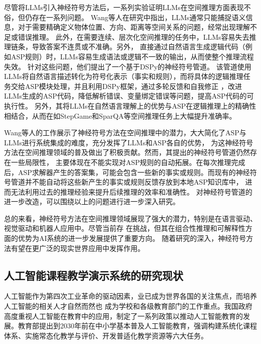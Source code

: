 尽管将LLMs引入神经符号方法后，一系列实验证明LLMs在空间推理方面表现不俗，但仍存在一系列问题。
Wang等人\cite{wang2024dspy}在研究中指出，LLMs通常只能捕捉语义信息，对于需要精确定义物体位置、方向、距离等空间关系的问题，经常出现理解不足或错误推理。
此外，在需要连续、层次化空间推理的任务中，LLMs容易失去推理链条，导致答案不连贯或不准确。另外，
直接通过自然语言生成逻辑代码（例如ASP规则）时，LLMs容易生成语法或逻辑不一致的输出，从而使整个推理流程失效。
针对这些问题，他们提出了一个基于DSPy的神经符号管道。
该管道使用LLMs将自然语言描述转化为符号化表示（事实和规则），而将具体的逻辑推理任务交给ASP模块处理，并且利用DSPy框架，通过多轮反馈和自我修正
，改进LLMs生成的ASP代码，降低解析错误、变量绑定错误等问题，提高ASP代码的可执行性。
另外，其将LLMs在自然语言理解上的优势与ASP在逻辑推理上的精确性相结合，从而在如StepGame和SparQA等空间推理任务上大幅提升准确率。

Wang等人\cite{wang2024dspy}的工作展示了神经符号方法在空间推理中的潜力，大大简化了ASP与LLMs进行系统集成的难度，充分发挥了LLMs和ASP各自的优势，
为这神经符号方法在空间推理领域的普及做出了积极贡献。然而，其提出的神经符号管道仍然存在一些局限性，
主要体现在不能实现对ASP规则的自动拓展。在每次推理完成后，ASP求解器产生的答案集，可能会包含一些新的事实或规则。而现有的神经符号管道并不能自动将这些新产生的事实或规则反馈存放到本地ASP知识库中，
进而无法利用过去的推理经验来提升后续推理的效率和准确性。
对神经符号管道的进一步改造，可以围绕以上的问题进行进一步深入研究。

总的来看，神经符号方法在空间推理领域展现了强大的潜力，特别是在语言驱动、视觉驱动和机器人应用中。尽管当前存
在挑战，但其在组合性推理和可解释性方面的优势为AI系统的进一步发展提供了重要方向。
随着研究的深入，神经符号方法有望在更广泛的现实世界应用中发挥作用。
\subsection{人工智能课程教学演示系统的研究现状}
人工智能作为第四次工业革命的驱动因素，业已成为世界各国的关注焦点，而培养人工智能的相关人才自然而然也
成为学校和各级教育部门的工作重点。我国政府高度重视人工智能在教育中的应用，制定了一系列政策以推动人工智能教育的发展。
​教育部提出到2030年前在中小学基本普及人工智能教育，强调构建系统化课程体系、实施常态化教学与评价、开发普适化教学资源等六大任务。\cite{moe_ai_2024}

